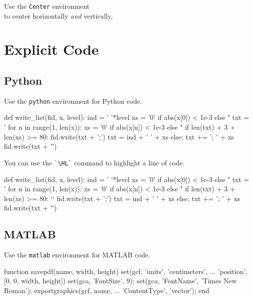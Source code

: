 \documentclass{antclass}
\newif\ifshow\showtrue
\begin{document}
\begin{Center}
    \Large Use the \texttt{Center} environment \\
    to center horizontally \emph{and} vertically.
\end{Center}

\chapter{Explicit Code}

\section{Python}\onecolumn

\ifshow
Use the \verb|python| environment for Python code.
\begin{python}
def write_list(fid, x, level):
    ind = '  '*level
    xs = '0' if abs(x[0]) < 1e-3 else "%
    txt = '\n%
    for n in range(1, len(x)):
        xs = '0' if abs(x[n]) < 1e-3 else "%
        if len(txt) + 3 + len(xs) >= 80:
            fid.write(txt + ';\n')
            txt = ind + '  ' + xs
        else:
            txt += '; ' + xs
    fid.write(txt + '\"')
\end{python}
\pagebreak\addtocounter{page}{-1}
\fi
You can use the \verb|`\HL`| command to highlight a line of code.
\begin{python}
def write_list(fid, x, level):
    ind = '  '*level
    xs = '0' if abs(x[0]) < 1e-3 else "%
    txt = '\n%
    for n in range(1, len(x)):
        xs = '0' if abs(x[n]) < 1e-3 else "%
        if len(txt) + 3 + len(xs) >= 80:
`\HL`            fid.write(txt + ';\n')
            txt = ind + '  ' + xs
        else:
            txt += '; ' + xs
    fid.write(txt + '\"')
\end{python}

\section{MATLAB}

Use the \verb|matlab| environment for MATLAB code.
\begin{matlab}
function savepdf(name, width, height)
    set(gcf, 'units', 'centimeters', ...
        'position', [0, 0, width, height])
    set(gca, 'FontSize', 9);
    set(gca, 'FontName', 'Times New Roman');
    exportgraphics(gcf, name, ...
        'ContentType', 'vector');
end
\end{matlab}
\end{document}
